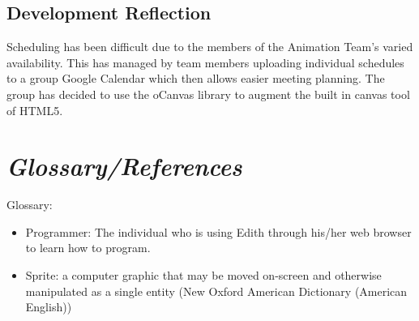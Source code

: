\documentclass[12pt]{article}
\begin{document}
\noindent\subsection{Development Reflection}
Scheduling has been difficult due to the members of the Animation Team's varied availability.  This has managed by team members uploading individual schedules to a group Google Calendar which then allows easier meeting planning.  The group has decided to use the oCanvas library to augment the built in canvas tool of HTML5.



\section{\emph{Glossary/References}}
Glossary:
\begin{itemize}
	\item Programmer: The individual who is using Edith through his/her web browser to learn how to program.
	\item Sprite: a computer graphic that may be moved on-screen and otherwise manipulated as a single entity (New Oxford American Dictionary (American English))
\end{itemize}
	

	
\end{document}
